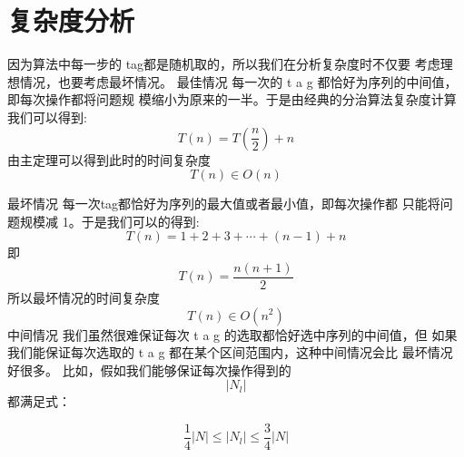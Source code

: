 \section{复杂度分析}
因为算法中每一步的 tag都是随机取的，所以我们在分析复杂度时不仅要 考虑理想情况，也要考虑最坏情况。
最佳情况  \quad  每一次的  t a g  都恰好为序列的中间值，即每次操作都将问题规 模缩小为原来的一半。于是由经典的分治算法复杂度计算我们可以得到:
$$T(n)=T\left(\frac{n}{2}\right)+n$$
由主定理可以得到此时的时间复杂度
$$T(n) \in O(n)$$

最坏情况 每一次tag都恰好为序列的最大值或者最小值，即每次操作都 只能将问题规模减 1。于是我们可以的得到:
$$
T(n)=1+2+3+\cdots+(n-1)+n
$$
即
$$
T(n)=\frac{n(n+1)}{2}
$$
所以最坏情况的时间复杂度
$$
T(n) \in O\left(n^{2}\right)
$$
中间情况  \quad  我们虽然很难保证每次  t a g  的选取都恰好选中序列的中间值，但
如果我们能保证每次选取的  t a g  都在某个区间范围内，这种中间情况会比 最坏情况好很多。
比如，假如我们能够保证每次操作得到的  
$$\left|N_{l}\right|  $$
都满足式：

$$\frac{1}{4}|N| \leq\left|N_{l}\right| \leq \frac{3}{4}|N|$$

